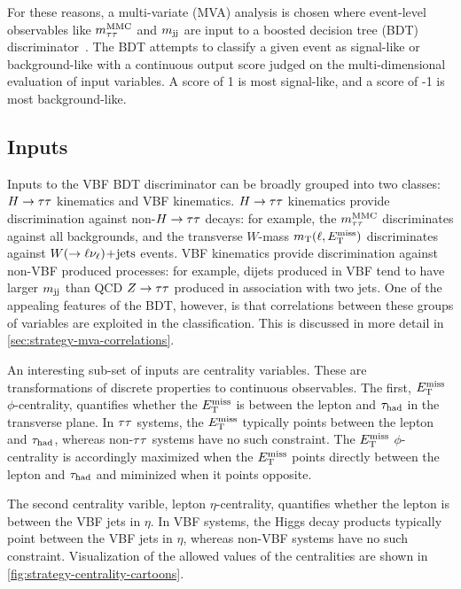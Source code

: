 For these reasons, a multi-variate (MVA) analysis is chosen where event-level observables like $m_{\tau\tau}^\text{MMC}$ and $m_{\text{jj}}$ are input to a boosted decision tree (BDT) discriminator~\cite{1984.decision-trees,2004.bdts-miniboone}. The BDT attempts to classify a given event as signal-like or background-like with a continuous output score judged on the multi-dimensional evaluation of input variables. A score of 1 is most signal-like, and a score of -1 is most background-like.

\subsection{Inputs}
\label{sec:strategy-mva-inputs}

Inputs to the VBF BDT discriminator can be broadly grouped into two classes: $H\rightarrow\tau\tau$ kinematics and VBF kinematics. $H\rightarrow\tau\tau$ kinematics provide discrimination against non-$H\rightarrow\tau\tau$ decays: for example, the $m_{\tau\tau}^\text{MMC}$ discriminates against all backgrounds, and the transverse $W$-mass $m_\text{T}(\ell, E_{\mathrm{T}}^{\mathrm{miss}})$ discriminates against $W (\rightarrow \ell\nu_\ell)\!+\!\text{jets}$ events. VBF kinematics provide discrimination against non-VBF produced processes: for example, dijets produced in VBF tend to have larger $m_{\text{jj}}$ than QCD $Z\rightarrow\tau\tau$ produced in association with two jets. One of the appealing features of the BDT, however, is that correlations between these groups of variables are exploited in the classification. This is discussed in more detail in \cref{sec:strategy-mva-correlations}.

An interesting sub-set of inputs are centrality variables. These are transformations of discrete properties to continuous observables. The first, $E_{\mathrm{T}}^{\mathrm{miss}}$ $\phi$-centrality, quantifies whether the $E_{\mathrm{T}}^{\mathrm{miss}}$ is between the lepton and $\tau_\text{had}$ in the transverse plane. In $\tau\tau$ systems, the $E_{\mathrm{T}}^{\mathrm{miss}}$ typically points between the lepton and $\tau_\text{had}$, whereas non-$\tau\tau$ systems have no such constraint. The $E_{\mathrm{T}}^{\mathrm{miss}}$ $\phi$-centrality is accordingly maximized when the $E_{\mathrm{T}}^{\mathrm{miss}}$ points directly between the lepton and $\tau_\text{had}$ and miminized when it points opposite.

The second centrality varible, lepton $\eta$-centrality, quantifies whether the lepton is between the VBF jets in $\eta$. In VBF systems, the Higgs decay products typically point between the VBF jets in $\eta$, whereas non-VBF systems have no such constraint. Visualization of the allowed values of the centralities are shown in \cref{fig:strategy-centrality-cartoons}.

